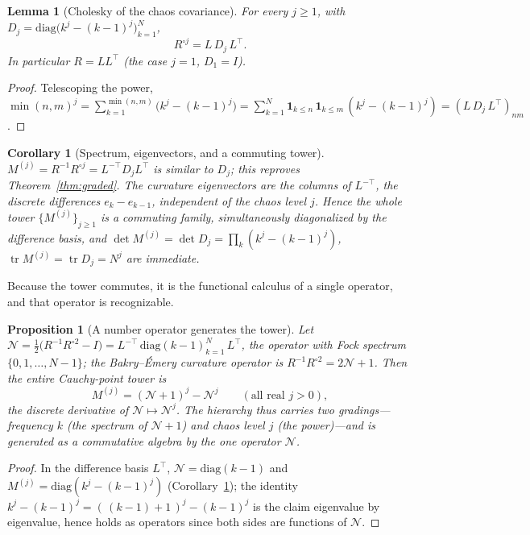 \documentclass[11pt,reqno]{amsart}
\theoremstyle{plain}
\newtheorem{proposition}[theorem]{Proposition}
\newtheorem{lemma}[theorem]{Lemma}
\newtheorem{corollary}[theorem]{Corollary}
\theoremstyle{definition}
\theoremstyle{remark}
\newcommand{\Had}{\circ}
\DeclareMathOperator{\tr}{tr}
\begin{document}
\begin{lemma}[Cholesky of the chaos covariance]\label{lem:chol}
For every $j\ge1$, with $D_j=\mathrm{diag}\bigl(k^j-(k-1)^j\bigr)_{k=1}^N$,
\[
   R^{\Had j}=L\,D_j\,L^{\top}.
\]
In particular $R=LL^{\top}$ (the case $j=1$, $D_1=I$).
\end{lemma}

\begin{proof}
Telescoping the power,
$\min(n,m)^j=\sum_{k=1}^{\min(n,m)}\bigl(k^j-(k-1)^j\bigr)
=\sum_{k=1}^N\mathbf 1_{k\le n}\,\mathbf 1_{k\le m}\,(k^j-(k-1)^j)
=(L\,D_j\,L^{\top})_{nm}$.
\end{proof}

\begin{corollary}[Spectrum, eigenvectors, and a commuting tower]
\label{cor:innov}
$M^{(j)}=R^{-1}R^{\Had j}=L^{-\top}D_jL^{\top}$ is similar to $D_j$;
this reproves Theorem~\ref{thm:graded}. The curvature eigenvectors are
the columns of $L^{-\top}$, the discrete differences $e_k-e_{k-1}$,
\emph{independent of the chaos level $j$}. Hence the whole tower
$\{M^{(j)}\}_{j\ge1}$ is a commuting family, simultaneously diagonalized
by the difference basis, and $\det M^{(j)}=\det D_j=\prod_k(k^j-(k-1)^j)$,
$\tr M^{(j)}=\tr D_j=N^j$ are immediate.
\end{corollary}

Because the tower commutes, it is the functional calculus of a single
operator, and that operator is recognizable.

\begin{proposition}[A number operator generates the tower]\label{prop:numberop}
Let $\mathcal N=\tfrac12\bigl(R^{-1}R^{\Had2}-I\bigr)
=L^{-\top}\,\mathrm{diag}(k-1)_{k=1}^N\,L^{\top}$, the operator with Fock
spectrum $\{0,1,\dots,N-1\}$; the Bakry--\'Emery curvature operator is
$R^{-1}R^{\Had2}=2\mathcal N+1$. Then the entire Cauchy-point tower is
\[
   M^{(j)}=(\mathcal N+1)^{j}-\mathcal N^{j}\qquad(\text{all real }j>0),
\]
the discrete derivative of $\mathcal N\mapsto\mathcal N^{j}$. The
hierarchy thus carries two gradings---frequency $k$ (the spectrum of
$\mathcal N+1$) and chaos level $j$ (the power)---and is generated as a
commutative algebra by the one operator $\mathcal N$.
\end{proposition}

\begin{proof}
In the difference basis $L^{\top}$, $\mathcal N=\mathrm{diag}(k-1)$ and
$M^{(j)}=\mathrm{diag}(k^j-(k-1)^j)$ (Corollary~\ref{cor:innov}); the
identity $k^j-(k-1)^j=(\,(k-1)+1\,)^j-(k-1)^j$ is the claim eigenvalue by
eigenvalue, hence holds as operators since both sides are functions of
$\mathcal N$.
\end{proof}
\end{document}
